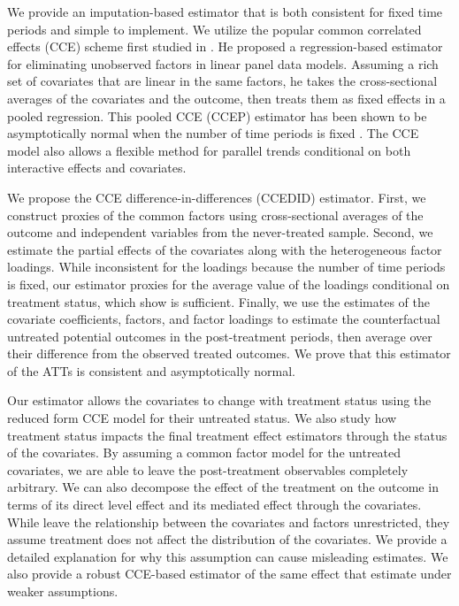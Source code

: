 \documentclass[12pt,fleqn]{article}
\begin{document}
We provide an imputation-based estimator that is both consistent for fixed time periods and simple to implement. We utilize the popular common correlated effects (CCE) scheme first studied in \citet{pesaran2006estimation}. He proposed a regression-based estimator for eliminating unobserved factors in linear panel data models. Assuming a rich set of covariates that are linear in the same factors, he takes the cross-sectional averages of the covariates and the outcome, then treats them as fixed effects in a pooled regression. This pooled CCE (CCEP) estimator has been shown to be asymptotically normal when the number of time periods is fixed \citep{westerlund2019cce,Brown_Schmidt_Wooldridge_2021}. The CCE model also allows a flexible method for parallel trends conditional on both interactive effects and covariates.

We propose the CCE difference-in-differences (CCEDID) estimator. First, we construct proxies of the common factors using cross-sectional averages of the outcome and independent variables from the never-treated sample. Second, we estimate the partial effects of the covariates along with the heterogeneous factor loadings. While inconsistent for the loadings because the number of time periods is fixed, our estimator proxies for the average value of the loadings conditional on treatment status, which \citet{brown2022generalized} show is sufficient. Finally, we use the estimates of the covariate coefficients, factors, and factor loadings to estimate the counterfactual untreated potential outcomes in the post-treatment periods, then average over their difference from the observed treated outcomes. We prove that this estimator of the ATTs is consistent and asymptotically normal. 

Our estimator allows the covariates to change with treatment status using the reduced form CCE model for their untreated status. We also study how treatment status impacts the final treatment effect estimators through the status of the covariates. By assuming a common factor model for the untreated covariates, we are able to leave the post-treatment observables completely arbitrary. We can also decompose the effect of the treatment on the outcome in terms of its direct level effect and its mediated effect through the covariates. While \citet{chan2022pcdid} leave the relationship between the covariates and factors unrestricted, they assume treatment does not affect the distribution of the covariates. We provide a detailed explanation for why this assumption can cause misleading estimates. We also provide a robust CCE-based estimator of the same effect that \citet{chan2022pcdid} estimate under weaker assumptions.
\end{document}
